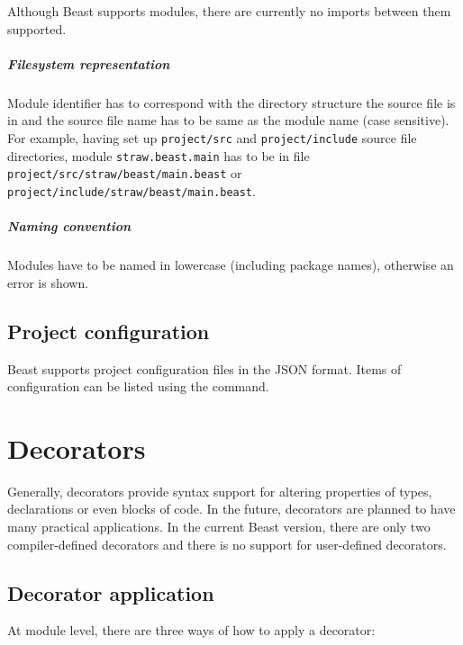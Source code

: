 Although Beast supports modules, there are currently no imports between them supported.

\paragraph{Filesystem representation} Module identifier has to correspond with the directory structure the source file is in and the source file name has to be same as the module name (case sensitive). For example, having set up \verb|project/src| and \verb|project/include| source file directories, module \verb|straw.beast.main| has to be in file \verb|project/src/straw/beast/main.beast| or \verb|project/include/straw/beast/main.beast|.

\paragraph{Naming convention} Modules have to be named in lowercase (including package names), otherwise an error is shown.

\section{Project configuration}
Beast supports project configuration files in the JSON format. Items of configuration can be listed using the  command.

\chapter{Decorators}

\begin{grammar}
	  
\end{grammar}

Generally, decorators provide syntax support for altering properties of types, declarations or even blocks of code. In the future, decorators are planned to have many practical applications. In the current Beast version, there are only two compiler-defined decorators and there is no support for user-defined decorators.

\section{Decorator application}
At module level, there are three ways of how to apply a decorator:

